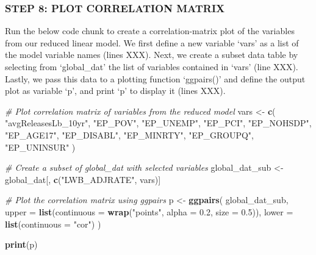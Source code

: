 \documentclass[
  12pt,
]{article}
\newenvironment{Shaded}{\begin{snugshade}}{\end{snugshade}}
\newcommand{\AttributeTok}[1]{\textcolor[rgb]{0.13,0.29,0.53}{#1}}
\newcommand{\CommentTok}[1]{\textcolor[rgb]{0.56,0.35,0.01}{\textit{#1}}}
\newcommand{\FloatTok}[1]{\textcolor[rgb]{0.00,0.00,0.81}{#1}}
\newcommand{\FunctionTok}[1]{\textcolor[rgb]{0.13,0.29,0.53}{\textbf{#1}}}
\newcommand{\NormalTok}[1]{#1}
\newcommand{\OtherTok}[1]{\textcolor[rgb]{0.56,0.35,0.01}{#1}}
\newcommand{\StringTok}[1]{\textcolor[rgb]{0.31,0.60,0.02}{#1}}
\begin{document}
\hypertarget{step-8-plot-correlation-matrix}{%
\subsubsection{STEP 8: PLOT CORRELATION
MATRIX}\label{step-8-plot-correlation-matrix}}

Run the below code chunk to create a correlation-matrix plot of the
variables from our reduced linear model. We first define a new variable
`vars' as a list of the model variable names (lines XXX). Next, we
create a subset data table by selecting from `global\_dat' the list of
variables contained in `vars' (line XXX). Lastly, we pass this data to a
plotting function `ggpairs()' and define the output plot as variable
`p', and print `p' to display it (lines XXX).

\begin{Shaded}
\begin{Highlighting}[]
\CommentTok{\# Plot correlation matrix of variables from the reduced model}
\NormalTok{vars }\OtherTok{\textless{}{-}} \FunctionTok{c}\NormalTok{(}
  \StringTok{"avgReleasesLb\_10yr"}\NormalTok{, }\StringTok{"EP\_POV"}\NormalTok{, }\StringTok{"EP\_UNEMP"}\NormalTok{, }\StringTok{"EP\_PCI"}\NormalTok{, }
  \StringTok{"EP\_NOHSDP"}\NormalTok{, }\StringTok{"EP\_AGE17"}\NormalTok{, }\StringTok{"EP\_DISABL"}\NormalTok{, }\StringTok{"EP\_MINRTY"}\NormalTok{, }
  \StringTok{"EP\_GROUPQ"}\NormalTok{, }\StringTok{"EP\_UNINSUR"}
\NormalTok{)}

\CommentTok{\# Create a subset of \textquotesingle{}global\_dat\textquotesingle{} with selected variables}
\NormalTok{global\_dat\_sub }\OtherTok{\textless{}{-}}\NormalTok{ global\_dat[, }\FunctionTok{c}\NormalTok{(}\StringTok{"LWB\_ADJRATE"}\NormalTok{, vars)]}

\CommentTok{\# Plot the correlation matrix using ggpairs}
\NormalTok{p }\OtherTok{\textless{}{-}} \FunctionTok{ggpairs}\NormalTok{(}
\NormalTok{  global\_dat\_sub,}
  \AttributeTok{upper =} \FunctionTok{list}\NormalTok{(}\AttributeTok{continuous =} \FunctionTok{wrap}\NormalTok{(}\StringTok{"points"}\NormalTok{, }\AttributeTok{alpha =} \FloatTok{0.2}\NormalTok{, }\AttributeTok{size =} \FloatTok{0.5}\NormalTok{)),}
  \AttributeTok{lower =} \FunctionTok{list}\NormalTok{(}\AttributeTok{continuous =} \StringTok{"cor"}\NormalTok{)}
\NormalTok{)}

\FunctionTok{print}\NormalTok{(p)}
\end{Highlighting}
\end{Shaded}
\end{document}
